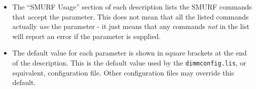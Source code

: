 \documentclass[twoside,11pt]{article}
\renewcommand{\_}{\texttt{\symbol{95}}}
\begin{document}
\begin{itemize}
\item The ``SMURF Usage'' section of each description lists the SMURF
commands that accept the parameter. This does not mean that all the
listed commands actually \emph{use} the parameter - it just means that
any commands \emph{not} in the list will report an error if the parameter
is supplied.
\item The default value for each parameter is shown in square brackets at
the end of the description. This is the default value used by the
\texttt{dimmconfig.lis}, or equivalent, configuration file. Other configuration
files may override this default.
\end{itemize}


\end{document}
